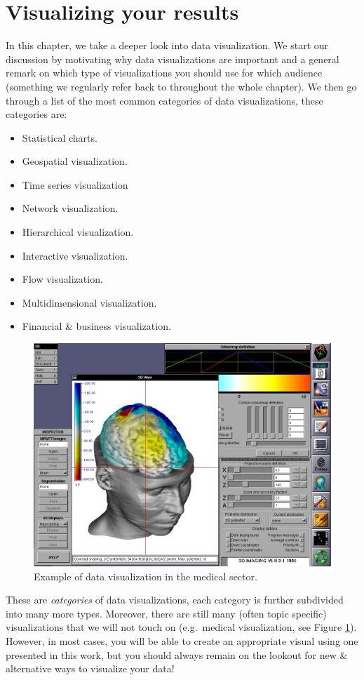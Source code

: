 \documentclass[10pt]{extarticle}
\newcommand{\<}{\langle}
\renewcommand{\>}{\rangle}
\theoremstyle{mystyle}{\newtheorem*{remark}{Remark}}
\theoremstyle{mystyle}{\newtheorem*{remarks}{Remarks}}
\theoremstyle{mystyle}{\newtheorem*{example}{Example}}
\theoremstyle{mystyle}{\newtheorem*{examples}{Examples}}
\theoremstyle{definition}{\newtheorem*{exercise}{Exercise}}
\theoremstyle{warn}
\begin{document}
\section{Visualizing your results}
In this chapter, we take a deeper look into data visualization. We start our discussion by motivating why data visualizations are important and a general remark on which type of visualizations you should use for which audience (something we regularly refer back to throughout the whole chapter). We then go through a list of the most common categories of data visualizations, these categories are:
\begin{itemize}
\item Statistical charts.
\item Geospatial visualization.
\item Time series visualization
\item Network visualization.
\item Hierarchical visualization.
\item Interactive visualization.
\item Flow visualization.
\item Multidimensional visualization.
\item Financial \& business visualization.
\end{itemize}
\begin{figure}
\center
\includegraphics[scale=0.2]{figures/visualizations/medical_visualization.jpg} 
\caption{Example of data visualization in the medical sector.}\label{fig:datavis_medical}
\end{figure}
\begin{remark}
These are \textit{categories} of data visualizations, each category is further subdivided into many more types. Moreover, there are still many (often topic specific) visualizations that we will not touch on (e.g.~medical visualization, see Figure \ref{fig:datavis_medical}). However, in most cases, you will be able to create an appropriate visual using one presented in this work, but you should always remain on the lookout for new \& alternative ways to visualize your data!
\end{remark}
\end{document}
